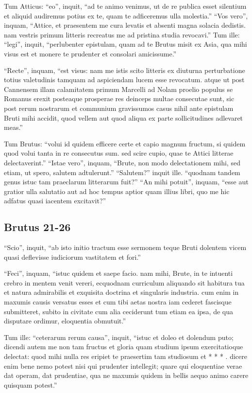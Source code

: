 Tum Atticus: ``eo'', inquit, ``ad te animo venimus, ut de re publica esset silentium et aliquid audiremus potius ex te, quam te adficeremus ulla molestia.'' ``Vos vero'', inquam, ``Attice, et praesentem me cura levatis et absenti magna solacia dedistis. nam vestris primum litteris recreatus me ad pristina studia revocavi.'' Tum ille: ``legi'', inquit, ``perlubenter epistulam, quam ad te Brutus misit ex Asia, qua mihi visus est et monere te prudenter et consolari amicissume.''

``Recte'', inquam, ``est visus: nam me istis scito litteris ex diuturna perturbatione totius valetudinis tamquam ad aspiciendam lucem esse revocatum. atque ut post Cannensem illam calamitatem primum Marcelli ad Nolam proelio populus se Romanus erexit posteaque prosperae res deinceps multae consecutae sunt, sic post rerum nostrarum et communium gravissumos casus nihil ante epistulam Bruti mihi accidit, quod vellem aut quod aliqua ex parte sollicitudines adlevaret meas.''

Tum Brutus: ``volui id quidem efficere certe et capio magnum fructum, si quidem quod volui tanta in re consecutus sum. sed scire cupio, quae te Attici litterae delectaverint.'' ``Istae vero'', inquam, ``Brute, non modo delectationem mihi, sed etiam, ut spero, salutem adtulerunt.'' ``Salutem?'' inquit ille. ``quodnam tandem genus istuc tam praeclarum litterarum fuit?'' ``An mihi potuit'', inquam, ``esse aut gratior ulla salutatio aut ad hoc tempus aptior quam illius libri, quo me hic adfatus quasi iacentem excitavit?''

\subsection*{Brutus 21-26}

``Scio'', inquit, ``ab isto initio tractum esse sermonem teque Bruti dolentem vicem quasi deflevisse iudiciorum vastitatem et fori.''

``Feci'', inquam, ``istuc quidem et saepe facio. nam mihi, Brute, in te intuenti crebro in mentem venit vereri, ecquodnam curriculum aliquando sit habitura tua et natura admirabilis et exquisita doctrina et singularis industria. cum enim in maxumis causis versatus esses et cum tibi aetas nostra iam cederet fascisque submitteret, subito in civitate cum alia ceciderunt tum etiam ea ipsa, de qua disputare ordimur, eloquentia obmutuit.''

Tum ille: ``ceterarum rerum causa'', inquit, ``istuc et doleo et dolendum puto; dicendi autem me non tam fructus et gloria quam studium ipsum exercitatioque delectat: quod mihi nulla res eripiet te praesertim tam studiosum et * * * . dicere enim bene nemo potest nisi qui prudenter intellegit; quare qui eloquentiae verae dat operam, dat prudentiae, qua ne maxumis quidem in bellis aequo animo carere quisquam potest.''

